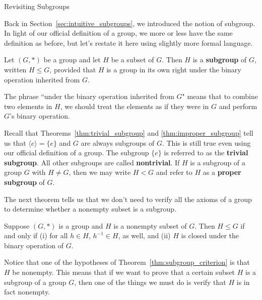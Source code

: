 \begin{section}{Revisiting Subgroups}

Back in Section~\ref{sec:intuitive_subgroups}, we introduced the notion of subgroup.  In light of our official definition of a group, we more or less have the same definition as before, but let's restate it here using slightly more formal language.

\begin{definition}
Let $(G,*)$ be a group and let $H$ be a subset of $G$.  Then $H$ is a \textbf{subgroup} of $G$, written $H\leq G$, provided that $H$ is a group in its own right under the binary operation inherited from $G$.
\end{definition}

The phrase ``under the binary operation inherited from $G$" means that to combine two elements in $H$, we should treat the elements as if they were in $G$ and perform $G$'s binary operation.

Recall that Theorems~\ref{thm:trivial_subgroup} and \ref{thm:improper_subgroup} tell us that $\langle e\rangle=\{e\}$ and $G$ are always subgroups of $G$. This is still true even using our official definition of a group.  The subgroup $\{e\}$ is referred to as the \textbf{trivial subgroup}.  All other subgroups are called \textbf{nontrivial}.  If $H$ is a subgroup of a group $G$ with $H\neq G$, then we may write $H<G$ and refer to $H$ as a \textbf{proper subgroup} of $G$.

The next theorem tells us that we don't need to verify all the axioms of a group to determine whether a nonempty subset is a subgroup.

\begin{theorem}\label{thm:subgroup_criterion}
Suppose $(G,*)$ is a group and $H$ is a nonempty subset of $G$.  Then $H\leq G$ if and only if (i) for all $h\in H$, $h^{-1} \in H$, as well, and (ii) $H$ is closed under the binary operation of $G$.
\end{theorem}

\begin{remark}
Notice that one of the hypotheses of Theorem~\ref{thm:subgroup_criterion} is that $H$ be nonempty.  This means that if we want to prove that a certain subset $H$ is a subgroup of a group $G$, then one of the things we must do is verify that $H$ is in fact nonempty.


\end{remark}
\end{section}
